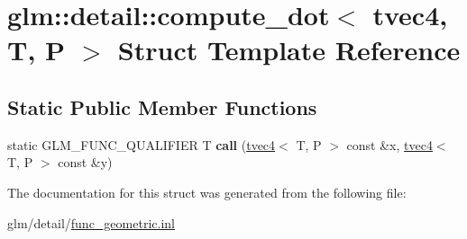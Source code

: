 \hypertarget{structglm_1_1detail_1_1compute__dot_3_01tvec4_00_01T_00_01P_01_4}{\section{glm\-:\-:detail\-:\-:compute\-\_\-dot$<$ tvec4, T, P $>$ Struct Template Reference}
\label{structglm_1_1detail_1_1compute__dot_3_01tvec4_00_01T_00_01P_01_4}
}
\subsection*{Static Public Member Functions}
\begin{DoxyCompactItemize}
\item 
\hypertarget{structglm_1_1detail_1_1compute__dot_3_01tvec4_00_01T_00_01P_01_4_a280557c9f78546e33e4946241c36ee29}{static G\-L\-M\-\_\-\-F\-U\-N\-C\-\_\-\-Q\-U\-A\-L\-I\-F\-I\-E\-R T {\bfseries call} (\hyperlink{structglm_1_1tvec4}{tvec4}$<$ T, P $>$ const \&x, \hyperlink{structglm_1_1tvec4}{tvec4}$<$ T, P $>$ const \&y)}\label{structglm_1_1detail_1_1compute__dot_3_01tvec4_00_01T_00_01P_01_4_a280557c9f78546e33e4946241c36ee29}

\end{DoxyCompactItemize}


The documentation for this struct was generated from the following file\-:\begin{DoxyCompactItemize}
\item 
glm/detail/\hyperlink{func__geometric_8inl}{func\-\_\-geometric.\-inl}\end{DoxyCompactItemize}
